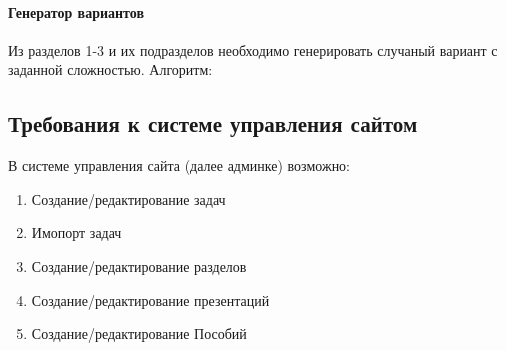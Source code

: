 \paragraph{Генератор вариантов}
Из разделов 1-3 и их подразделов необходимо генерировать случаный вариант с заданной сложностью.
Алгоритм:

\subsection{Требования к системе управления сайтом}
В системе управления сайта (далее админке) возможно:
\begin{enumerate}
  \item Создание/редактирование задач
  \item Имопорт задач
  \item Создание/редактирование разделов
  \item Создание/редактирование презентаций
  \item Создание/редактирование Пособий
\end{enumerate}
